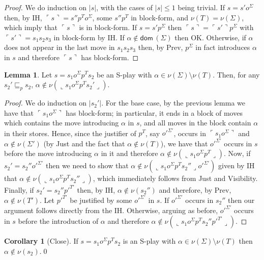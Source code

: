 \documentclass{CSML}
\theoremstyle{definition}\newtheorem{definition}[thm]{Definition}
\theoremstyle{definition}\newtheorem{example}[thm]{Example}
\theoremstyle{definition}\newtheorem{proposition}[thm]{Proposition}
\theoremstyle{definition}\newtheorem{lemma}[thm]{Lemma}
\theoremstyle{definition}\newtheorem{theorem}[thm]{Theorem}
\theoremstyle{definition}\newtheorem{corollary}[thm]{Corollary}
\theoremstyle{definition}\newtheorem{remark}[thm]{Remark}
\renewcommand\Sigma{\varSigma}
\newcommand\Tau{T}
\newcommand\ov[1]{\llcorner{#1}\lrcorner}
\newcommand\dom[1]{\mathsf{dom}\,#1}
\newcommand\prefix{\sqsubseteq_p}
\newcommand\pview[1]{\ulcorner{#1}\urcorner}
\newcommand\pv[1]{\pview{#1}}
\newcommand\na\alpha
\begin{document}
\begin{proof}
We do induction on $|s|$, with the cases of $|s|\leq 1 $ being trivial. If $s=s'o^\Sigma$ then, by IH, $\pv{s}=s''p^\Tau o^\Sigma$, some $s''p^\Tau$ in block-form, and $\nu(\Tau)=\nu(\Sigma)$, which imply that $\pv{s}$ is in block-form.
If $s=s'p^\Sigma$ then $\pv{s}=\pv{s'}p^\Sigma$ with $\pv{s'}=s_1s_2s_3$ in block-form by IH. If $\na\notin\dom(\Sigma)$ then OK. Otherwise, if $\na$ does not appear in the last move in $s_1s_2s_3$ then, by Prev,
$p^\Sigma$ in fact introduces $\na$ in $s$ and therefore $\pv{s}$ has block-form.
\end{proof}

\begin{lemma}\label{l:oviews}
Let $s=s_1o^\Sigma p^\Tau s_2$ be an S-play with $\na\in\nu(\Sigma)\setminus\nu(\Tau)$. Then, for any $s_2'\prefix s_2$, $\na\notin\nu(\ov{s_1o^\Sigma p^\Tau s_2'})$.
\end{lemma}
\begin{proof}
We do induction on $|s_2'|$. For the base case, by the previous lemma we have that $\pv{s_1o^\Sigma}$ has block-form; in particular, it ends in a block of moves which contains the move introducing $\na$ in $s$, and all moves in the block contain $\na$ in their stores. Hence, since the justifier of $p^\Tau$, say $o'^{\Sigma'}$, occurs in $\pv{s_1o^\Sigma}$ and $\na\notin\nu(\Sigma')$ (by Just and the fact that $\na\notin\nu(\Tau)$), we have that $o'^{\Sigma'}$ occurs in $s$ before the move introducing $\na$ in it and therefore $\na\notin\nu(\ov{s_1o^\Sigma p^\Tau})$.
Now, if $s_2'=s_2''o'^{\Sigma'}$ then we need to show that $\na\notin\nu(\ov{s_1o^\Sigma p^\Tau s_2''}o'^{\Sigma'})$ given by IH that $\na\notin\nu(\ov{s_1o^\Sigma p^\Tau s_2''})$, which immediately follows from Just and Visibility. Finally, if $s_2'=s_2''p'^{\Tau'}$ then, by IH, $\na\notin\nu(s_2'')$ and therefore, by Prev, $\na\notin\nu(\Tau')$. Let $p'^{\Tau'}$ be justified by some $o'^{\Sigma'}$ in $s$. If $o'^{\Sigma'}$ occurs in $s_2''$ then our argument follows directly from the IH. Otherwise, arguing as before, $o'^{\Sigma'}$ occurs in $s$ before the introduction of $\na$ and therefore $\na\notin\nu(\ov{s_1o^\Sigma p^\Tau s_2''p'^{\Tau'}})$.
\end{proof}

\begin{corollary}[Close]
If $s=s_1o^\Sigma p^\Tau s_2$ is an S-play with $\na\in \nu(\Sigma)\setminus\nu(\Tau)$ then $\na\notin\nu(s_2)$.\qed
\end{corollary}
\end{document}
